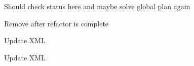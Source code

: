 
\begin{DoxyRefList}
\item[Member \mbox{\hyperlink{classtesseract__examples_1_1OnlinePlanningExample_a354985cdbaa511e24b5c010271477fad}{tesseract\+\_\+examples\+::Online\+Planning\+Example\+::online\+Plan}} ()]\label{todo__todo000004}%
%
Should check status here and maybe solve global plan again  
\item[Namespace \mbox{\hyperlink{namespacetesseract__planning}{tesseract\+\_\+planning}} ]\label{todo__todo000001}%
%
Remove after refactor is complete  
\item[Member \mbox{\hyperlink{classtesseract__planning_1_1DescartesDefaultPlanProfile_a8bbf9dd170dfc5da44f4117d74ca7a6a}{tesseract\+\_\+planning\+::Descartes\+Default\+Plan\+Profile\texorpdfstring{$<$}{<} Float\+Type \texorpdfstring{$>$}{>}\+::Descartes\+Default\+Plan\+Profile}} (const tinyxml2\+::\+XMLElement \&xml\+\_\+element)]\label{todo__todo000008}%
%
Update XML 

\label{todo__todo000009}%
%
Update XML 


\end{DoxyRefList}
